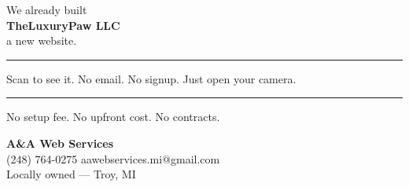 \documentclass[11pt,letterpaper]{article}
\begin{document}
\begin{center}

\newcommand{\businessname}{TheLuxuryPaw LLC}

\vspace*{0.1in}

{\fontsize{18}{22}\selectfont We already built}\\[0.1in]
{\fontsize{44}{48}\selectfont\bfseries \businessname}\\[0.1in]
{\fontsize{18}{22}\selectfont a new website.}

\vspace{0.3in}
\noindent\rule{\linewidth}{0.8pt}
\vspace{0.3in}

{\fontsize{15}{19}\selectfont Scan to see it. No email. No signup. Just open your camera.}

\vspace{0.35in}


\vspace{0.35in}
\noindent\rule{\linewidth}{0.8pt}
\vspace{0.3in}

{\fontsize{14}{18}\selectfont No setup fee. No upfront cost. No contracts.}

\vspace{0.3in}

{\fontsize{20}{24}\selectfont\bfseries A\&A Web Services}\\[0.15in]
{\fontsize{15}{19}\selectfont (248) 764-0275 \quad aawebservices.mi@gmail.com}\\[0.1in]
{\fontsize{12}{16}\selectfont Locally owned --- Troy, MI}

\vspace*{\fill}

\end{center}
\hfill{\color{gray!70}\fontsize{5}{6}}
\end{document}
